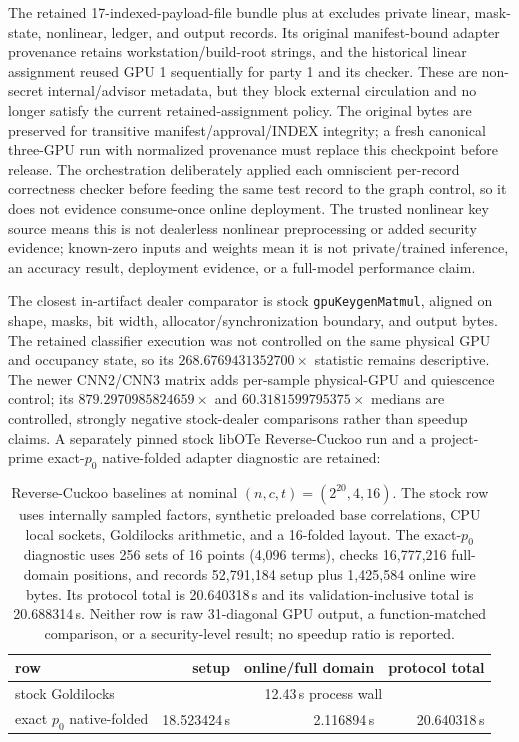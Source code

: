 \documentclass[11pt]{article}
\begin{document}
The retained 17-indexed-payload-file bundle plus  at
 excludes private
linear, mask-state, nonlinear, ledger, and output records. Its original
manifest-bound adapter provenance retains workstation/build-root strings, and
the historical linear assignment reused GPU 1 sequentially for party 1 and its
checker. These are non-secret internal/advisor metadata, but they block external
circulation and no longer satisfy the current retained-assignment policy. The
original bytes are preserved for transitive manifest/approval/INDEX integrity;
a fresh canonical three-GPU run with normalized provenance must replace this
checkpoint before release. The orchestration deliberately applied each
omniscient per-record correctness checker before feeding the same test record
to the graph control, so it does not evidence consume-once online deployment.
The trusted nonlinear key source means this is not dealerless nonlinear
preprocessing or added security evidence; known-zero inputs and weights mean it
is not private/trained inference, an accuracy result, deployment evidence, or a
full-model performance claim.

The closest in-artifact dealer comparator is stock
\texttt{gpuKeygenMatmul}, aligned on shape, masks, bit width,
allocator/synchronization boundary, and output bytes. The retained classifier
execution was not controlled on the same physical GPU and occupancy state, so
its $268.6769431352700\times$ statistic remains descriptive. The newer
CNN2/CNN3 matrix adds per-sample physical-GPU and quiescence control; its
$879.2970985824659\times$ and $60.3181599795375\times$ medians are controlled,
strongly negative stock-dealer comparisons rather than speedup claims.
A separately pinned stock libOTe Reverse-Cuckoo run and a project-prime
exact-$p_0$ native-folded adapter diagnostic are retained:
\begin{table}[ht]
\centering
\small
\begin{tabular}{@{}l r r r@{}}
\toprule
row & setup & online/full domain & protocol total\\
\midrule
stock Goldilocks & \multicolumn{3}{c}{12.43\,s process wall}\\
exact $p_0$ native-folded & 18.523424\,s & 2.116894\,s & 20.640318\,s\\
\bottomrule
\end{tabular}
\caption{Reverse-Cuckoo baselines at nominal $(n,c,t)=(2^{20},4,16)$.
The stock row uses internally sampled factors, synthetic preloaded base
correlations, CPU local sockets, Goldilocks arithmetic, and a 16-folded layout.
The exact-$p_0$ diagnostic uses 256 sets of 16 points (4,096 terms), checks
16,777,216 full-domain positions, and records 52,791,184 setup plus 1,425,584
online wire bytes. Its protocol total is 20.640318\,s and its
validation-inclusive total is 20.688314\,s.
Neither row is raw 31-diagonal GPU output, a function-matched
comparison, or a security-level result; no speedup ratio is reported.}
\label{tab:reverse-cuckoo}
\end{table}
\end{document}
